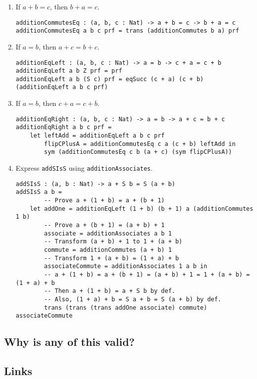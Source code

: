 \documentclass{article}
\newcommand{\inline}[1]{\texttt{#1}}
\begin{document}
\begin{enumerate}
    \item If $a + b = c$, then $b + a = c$.

\begin{verbatim}
additionCommutesEq : (a, b, c : Nat) -> a + b = c -> b + a = c
additionCommutesEq a b c prf = trans (additionCommutes b a) prf
\end{verbatim}

    \item If $a = b$, then $a + c = b + c$.

\begin{verbatim}
additionEqLeft : (a, b, c : Nat) -> a = b -> c + a = c + b
additionEqLeft a b Z prf = prf
additionEqLeft a b (S c) prf = eqSucc (c + a) (c + b) (additionEqLeft a b c prf)
\end{verbatim}

    \item If $a = b$, then $c + a = c + b$.

\begin{verbatim}
additionEqRight : (a, b, c : Nat) -> a = b -> a + c = b + c
additionEqRight a b c prf =
    let leftAdd = additionEqLeft a b c prf
        flipCPlusA = additionCommutesEq c a (c + b) leftAdd in
        sym (additionCommutesEq c b (a + c) (sym flipCPlusA))
\end{verbatim}

    \item Express \inline{addSIsS} using \inline{additionAssociates}.


\begin{verbatim}
addSIsS : (a, b : Nat) -> a + S b = S (a + b)
addSIsS a b =
        -- Prove a + (1 + b) = a + (b + 1)
    let addOne = additionEqLeft (1 + b) (b + 1) a (additionCommutes 1 b)
        -- Prove a + (b + 1) = (a + b) + 1
        associate = additionAssociates a b 1
        -- Transform (a + b) + 1 to 1 + (a + b)
        commute = additionCommutes (a + b) 1
        -- Transform 1 + (a + b) = (1 + a) + b
        associateCommute = additionAssociates 1 a b in
        -- a + (1 + b) = a + (b + 1) = (a + b) + 1 = 1 + (a + b) = (1 + a) + b
        -- Then a + (1 + b) = a + S b by def.
        -- Also, (1 + a) + b = S a + b = S (a + b) by def.
        trans (trans (trans addOne associate) commute) associateCommute
\end{verbatim}

\end{enumerate}

\subsection{Why is any of this valid?}

\subsection{Links}
\end{document}
